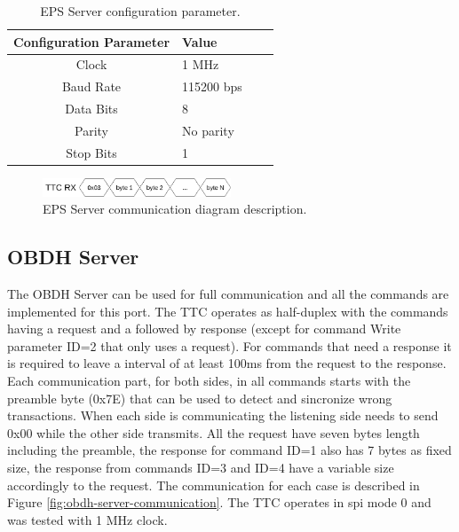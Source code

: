 \begin{table}[!ht]
    \centering
    \begin{tabular}{clll}
        \toprule[1.5pt]
        \textbf{Configuration Parameter} & \textbf{Value}\\
        \midrule
        Clock               & 1 MHz       \\
        Baud Rate           & 115200 bps  \\
        Data Bits           & 8           \\
        Parity              & No parity   \\
        Stop Bits           & 1           \\
        \bottomrule[1.5pt]
    \end{tabular}
    \caption{EPS Server configuration parameter.}
    \label{tab:eps_config}
\end{table}

\begin{figure}[!ht]
    \begin{center}
        \includegraphics[width=0.5\textwidth]{figures/eps_communication.drawio.png}
        \caption{EPS Server communication diagram description.}
        \label{fig:eps-server-communication}
    \end{center}
\end{figure}

\subsection{OBDH Server}
The OBDH Server can be used for full communication and all the commands are implemented for this port. The TTC operates as half-duplex with the commands having a request and a followed by response (except for command Write parameter ID=2 that only uses a request). For commands that need a response it is required to leave a interval of at least 100ms from the request to the response. Each communication part, for both sides, in all commands starts with the preamble byte (0x7E) that can be used to detect and sincronize wrong transactions. When each side is communicating the listening side needs to send 0x00 while the other side transmits.
All the request have seven bytes length including the preamble, the response for command ID=1 also has 7 bytes as fixed size, the response from commands ID=3 and ID=4 have a variable size accordingly to the request. The communication for each case is described in Figure \ref{fig:obdh-server-communication}. The TTC operates in spi mode 0 and was tested with 1 MHz clock.

